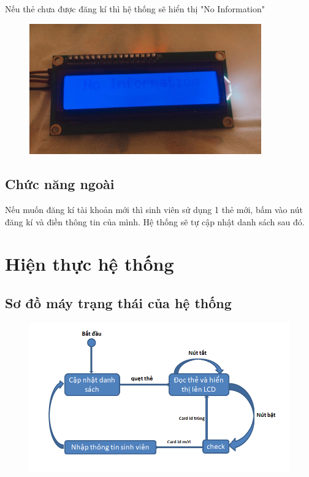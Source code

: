 \documentclass[12pt,titlepage,a4paper]{article}
\begin{document}
Nếu thẻ chưa được đăng kí thì hệ thống sẽ hiển thị "No Information"

\vspace{1cm}
\begin{figure}[h!]
\begin{center}
\includegraphics[width=10cm]{5.png}
\end{center}
\end{figure}
\vspace{1cm}
\subsection{Chức năng ngoài}
Nếu muốn đăng kí tài khoản mới thì sinh viên sử dụng 1 thẻ mới, bấm vào nút đăng kí và điền thông tin của mình. Hệ thống sẽ tự cập nhật danh sách sau đó. 
\newpage
\section{Hiện thực hệ thống}
\subsection{Sơ đồ máy trạng thái của hệ thống}
\vspace{1cm}
\begin{figure}[h!]
\begin{center}
\includegraphics[width=15cm]{6.png}
\end{center}
\end{figure}
\vspace{1cm}
\end{document}
